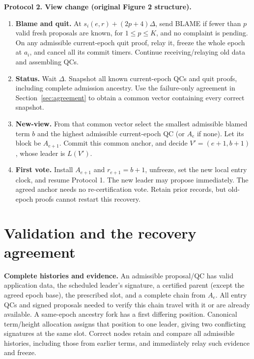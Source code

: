 \documentclass[10pt,a4paper]{article}
\newcommand{\chg}[1]{\textcolor{red!70!black}{#1}}
\begin{document}
\begin{mdframed}[linewidth=.6pt,innertopmargin=5pt,innerbottommargin=5pt]
\textbf{Protocol 2. View change (original Figure 2 structure).}
\begin{enumerate}[label=\textbf{\roman*.},itemsep=3pt]
\item \textbf{Blame and quit.} At $s_i(e,r)+(2p+4)\Delta$, send BLAME
if fewer than $p$ valid fresh proposals are known, for $1\le p\le K$,
and no complaint is pending. \chg{On any admissible current-epoch quit proof,
relay it, freeze the whole epoch at $a_i$, and cancel all its commit timers.
Continue receiving/relaying old data and assembling QCs.}
\item \textbf{Status.} Wait $\Delta$. \chg{Snapshot all known current-epoch
QCs and quit proofs, including complete admission ancestry. Use the
failure-only agreement in Section~\ref{sec:agreement} to obtain a common
vector containing every correct snapshot.}
\item \textbf{New-view.} \chg{From that common vector select the smallest
admissible blamed term $b$ and the highest admissible current-epoch QC
(or $A_e$ if none). Let its block be $A_{e+1}$. Commit this common anchor,
and decide $V'=(e+1,b+1)$, whose leader is $L(V')$.}
\item \textbf{First vote.} \chg{Install $A_{e+1}$ and $r_{e+1}=b+1$, unfreeze,
set the new local entry clock, and resume Protocol 1. The new leader may
propose immediately. The agreed anchor needs no re-certification vote.
Retain prior records, but old-epoch proofs cannot restart this recovery.}
\end{enumerate}
\end{mdframed}

\clearpage
\section*{Validation and the recovery agreement}\label{sec:agreement}
\textbf{Complete histories and evidence.} An admissible proposal/QC has valid
application data, the scheduled leader's signature, a certified parent
(except the agreed epoch base), the prescribed slot, and a complete chain
from $A_e$. All entry QCs and signed proposals needed to verify this chain
travel with it or are already available. A same-epoch ancestry fork has a
first differing position. Canonical term/height allocation assigns that
position to one leader, giving two conflicting signatures at the same slot.
Correct nodes retain and compare all admissible histories, including those
from earlier terms, and immediately relay such evidence and freeze.
\end{document}
